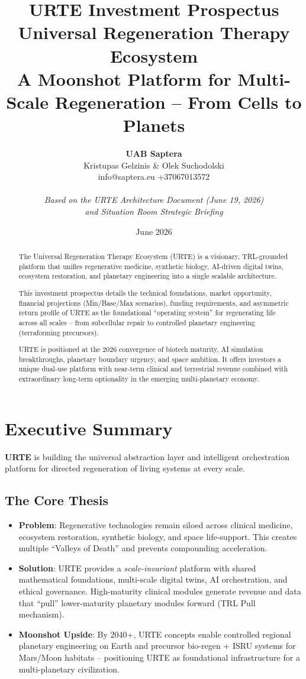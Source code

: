 \documentclass[11pt,a4paper]{article}
\title{\textbf{URTE Investment Prospectus}\\[0.3cm]
\large Universal Regeneration Therapy Ecosystem\\[0.2cm]
\normalsize A Moonshot Platform for Multi-Scale Regeneration -- From Cells to Planets}
\author{
\textbf{UAB Saptera} \\
Kristupas Gelzinis \& Olek Suchodolski \\
info@saptera.eu \quad +37067013572 \\
\vspace{0.3cm} \\
\textit{Based on the URTE Architecture Document (June 19, 2026)} \\
\textit{and Situation Room Strategic Briefing}
}
\date{June 2026}
\begin{document}
\maketitle

\begin{abstract}
\noindent The Universal Regeneration Therapy Ecosystem (URTE) is a visionary, TRL-grounded platform that unifies regenerative medicine, synthetic biology, AI-driven digital twins, ecosystem restoration, and planetary engineering into a single scalable architecture. 

This investment prospectus details the technical foundations, market opportunity, financial projections (Min/Base/Max scenarios), funding requirements, and asymmetric return profile of URTE as the foundational ``operating system'' for regenerating life across all scales -- from subcellular repair to controlled planetary engineering (terraforming precursors).

URTE is positioned at the 2026 convergence of biotech maturity, AI simulation breakthroughs, planetary boundary urgency, and space ambition. It offers investors a unique dual-use platform with near-term clinical and terrestrial revenue combined with extraordinary long-term optionality in the emerging multi-planetary economy.
\end{abstract}

\newpage
\tableofcontents
\newpage

\section{Executive Summary}

\textbf{URTE} is building the universal abstraction layer and intelligent orchestration platform for directed regeneration of living systems at every scale.

\subsection{The Core Thesis}
\begin{itemize}
    \item \textbf{Problem}: Regenerative technologies remain siloed across clinical medicine, ecosystem restoration, synthetic biology, and space life-support. This creates multiple ``Valleys of Death'' and prevents compounding acceleration.
    \item \textbf{Solution}: URTE provides a \textit{scale-invariant} platform with shared mathematical foundations, multi-scale digital twins, AI orchestration, and ethical governance. High-maturity clinical modules generate revenue and data that ``pull'' lower-maturity planetary modules forward (TRL Pull mechanism).
    \item \textbf{Moonshot Upside}: By 2040+, URTE concepts enable controlled regional planetary engineering on Earth and precursor bio-regen + ISRU systems for Mars/Moon habitats -- positioning URTE as foundational infrastructure for a multi-planetary civilization.
\end{itemize}
\end{document}
